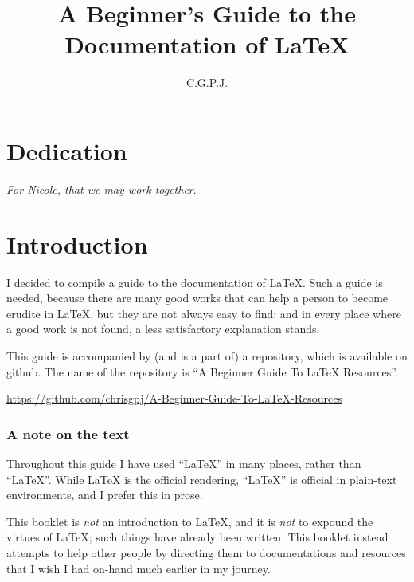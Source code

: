 \documentclass[11pt, oneside]{memoir}
\title{A Beginner's Guide to the Documentation of \LaTeX{}}
\author{C.\thinspace G.\thinspace P.\thinspace J.\thinspace}
\begin{document}
\maketitle
\thispagestyle{empty}

\RaggedRight

\chapter*{Dedication}
\emph{For Nicole, that we may work together}.

\newpage
\tableofcontents

\chapter{Introduction}
I decided to compile a guide to the documentation of \LaTeX{}. Such a guide is needed, because there are many good works that can help a person to become erudite in \LaTeX{}, but they are not always easy to find; and in every place where a good work is not found, a less satisfactory explanation stands.

This guide is accompanied by (and is a part of) a repository, which is available on github. The name of the repository is ``A Beginner Guide To LaTeX Resources''.

\url{https://github.com/chrisgpj/A-Beginner-Guide-To-LaTeX-Resources}

\subsection{A note on the text}
Throughout this guide I have used ``LaTeX'' in many places, rather than ``\LaTeX{}''. While \LaTeX{} is the official rendering, ``LaTeX'' is official in plain-text environments, and I prefer this in prose.

This booklet is \emph{not} an introduction to LaTeX, and it is \emph{not} to expound the virtues of LaTeX; such things have already been written. This booklet instead attempts to help other people by directing them to documentations and resources that I wish I had on-hand much earlier in my journey.

\end{document}
